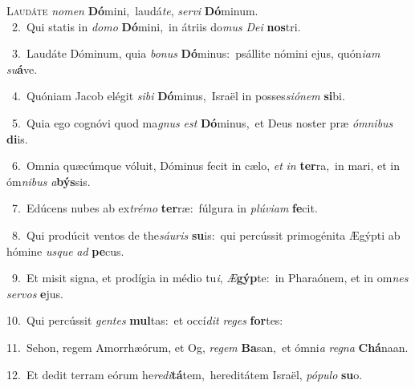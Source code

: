 \lettrine{\initial\textcolor{\initialcolor}{L}}{audáte} \textit{no}\-\textit{men} \textbf{Dó}\-mini,~\star laudá\-\textit{te}\-, \textit{ser}\-\textit{vi} \textbf{Dó}\-minum.\\
{\numbfont\textcolor{\numbcolor}{~2.}}~Qui statis in \textit{do}\-\textit{mo} \textbf{Dó}\-mini,~\star in átriis do\textit{mus} \textit{De}\-\textit{i} \textbf{nos}\-tri.\par
{\numbfont\textcolor{\numbcolor}{~3.}}~Laudáte Dóminum, quia \textit{bo}\-\textit{nus} \textbf{Dó}\-minus:~\star psállite nómini ejus, quón\-\textit{i}\-\textit{am} \textit{su}\-\textbf{á}ve.\par
{\numbfont\textcolor{\numbcolor}{~4.}}~Quóniam Jacob elégit \textit{si}\-\textit{bi} \textbf{Dó}\-minus,~\star Israël in posses\-\textit{si}\-\textit{ó}\textit{nem} \textbf{si}\-bi.\par
{\numbfont\textcolor{\numbcolor}{~5.}}~Quia ego cognóvi quod ma\textit{gnus} \textit{est} \textbf{Dó}\-minus,~\star et Deus noster præ \textit{óm}\-\textit{ni}\textit{bus} \textbf{di}\-is.\par
{\numbfont\textcolor{\numbcolor}{~6.}}~Omnia quæcúmque vóluit, Dóminus fecit in cælo, \textit{et} \textit{in} \textbf{ter}\-ra,~\star in mari, et in óm\-\textit{ni}\-\textit{bus} \textit{a}\-\textbf{býs}sis.\par
{\numbfont\textcolor{\numbcolor}{~7.}}~Edúcens nubes ab ex\-\textit{tré}\-\textit{mo} \textbf{ter}\-ræ:~\star fúlgura in \textit{plú}\-\textit{vi}\textit{am} \textbf{fe}\-cit.\par
{\numbfont\textcolor{\numbcolor}{~8.}}~Qui prodúcit ventos de the\-\textit{sáu}\-\textit{ris} \textbf{su}\-is:~\star qui percússit primogénita Ægýpti ab hómine \textit{us}\-\textit{que} \textit{ad} \textbf{pe}\-cus.\par
{\numbfont\textcolor{\numbcolor}{~9.}}~Et misit signa, et prodígia in médio tu\-\textit{i}\-, \textit{Æ}\-\textbf{gýp}te:~\star in Pharaónem, et in om\textit{nes} \textit{ser}\-\textit{vos} \textbf{e}\-jus.\par
{\numbfont\textcolor{\numbcolor}{10.}}~Qui percússit \textit{gen}\-\textit{tes} \textbf{mul}\-tas:~\star et occí\textit{dit} \textit{re}\-\textit{ges} \textbf{for}\-tes:\par
{\numbfont\textcolor{\numbcolor}{11.}}~Sehon, regem Amorrhæórum, et Og, \textit{re}\-\textit{gem} \textbf{Ba}\-san,~\star et ómni\textit{a} \textit{re}\-\textit{gna} \textbf{Chá}\-naan.\par
{\numbfont\textcolor{\numbcolor}{12.}}~Et dedit terram eórum he\-\textit{re}\-\textit{di}\textbf{tá}tem,~\star hereditátem Israël, \textit{pó}\-\textit{pu}\textit{lo} \textbf{su}\-o.\par
